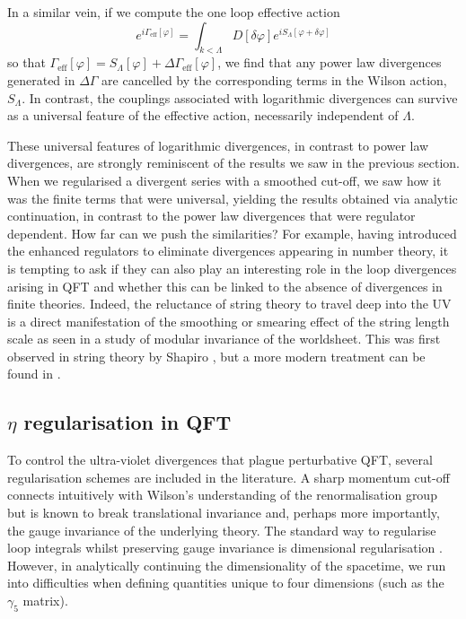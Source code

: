 \documentclass[12pt, letter]{article}
\def\be{\begin{equation}}
\def\ee{\end{equation}}
\begin{document}
In a similar vein,  if we compute the one loop effective action
\be
e^{i\Gamma_\text{eff}[\varphi]}=\int_{k<\Lambda} D [\delta \varphi]e^{iS_\Lambda[\varphi+\delta \varphi]}
\ee
so that $\Gamma_\text{eff}[\varphi]=S_\Lambda[\varphi]+\Delta \Gamma_\text{eff}[\varphi]$, we find that any power law divergences generated in $\Delta \Gamma$ are cancelled by the corresponding terms in the Wilson action, $S_\Lambda$.  In contrast, the couplings associated with logarithmic divergences can survive as a universal feature of the effective action, necessarily independent of $\Lambda$. 



These universal features of logarithmic divergences, in contrast to power law divergences,   are strongly reminiscent of the results we saw in the previous section. When we regularised a divergent series with a smoothed cut-off, we saw how it was the finite terms  that were universal,  yielding the results obtained via analytic continuation, in contrast to the power law divergences that were regulator dependent.  How far can we push the similarities? For example, having introduced the enhanced regulators to eliminate divergences  appearing in number theory, it is tempting to ask if they can also play an interesting role in the loop divergences arising in QFT and whether this can be linked to the absence of divergences in finite theories. Indeed, the reluctance of string theory to travel deep into the UV is a direct manifestation of the smoothing or smearing effect of the string length scale as seen in a study of modular invariance of the worldsheet. This was first observed in string theory by Shapiro \citep{Shapiro72}, but a more modern treatment can be found in \citep{Polchinski98}.



\subsection{$\eta$ regularisation in QFT} \label{sec:eta}

To control  the ultra-violet divergences that plague perturbative QFT, several regularisation schemes are included in the literature.  A sharp momentum cut-off connects intuitively with Wilson's understanding of the renormalisation group \cite{Kadanoff:1966wm, Wilson:1971bg,Wilson:1971dh,Wilson:1974mb} but is known to  break translational invariance and, perhaps more importantly, the gauge invariance of the underlying theory. The standard way to regularise loop integrals whilst preserving gauge invariance is dimensional regularisation \cite{tHooft:1972tcz}. However, in analytically continuing the dimensionality of the spacetime, we run into difficulties when defining quantities unique to
 four dimensions (such as the $\gamma_5$ matrix). 
 
\end{document}
